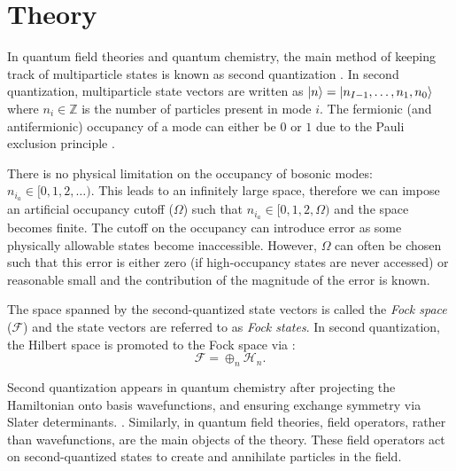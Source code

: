 \section{Theory}

In quantum field theories and quantum chemistry, the main method of keeping track of multiparticle states is known as second quantization \cite{Sakurai_Napolitano_2020}.
In second quantization, multiparticle state vectors are written as $\ket{n} = \ket{n_{I-1}, \dots, n_1, n_0}$ where $n_i \in \mathbb{Z}$ is the number of particles present in mode $i$.
The fermionic (and antifermionic) occupancy of a mode can either be $0$ or $1$ due to the Pauli exclusion principle .

There is no physical limitation on the occupancy of bosonic modes: $n_{i_a} \in [0, 1, 2, \dots)$.
This leads to an infinitely large space, therefore we can impose an artificial occupancy cutoff ($\Omega$) such that $n_{i_a} \in [0, 1, 2, \Omega)$ and the space becomes finite.
The cutoff on the occupancy can introduce error as some physically allowable states become inaccessible.
However, $\Omega$ can often be chosen such that this error is either zero (if high-occupancy states are never accessed) or reasonable small and the contribution of the magnitude of the error is known. 

The space spanned by the second-quantized state vectors is called the \textit{Fock space} ($\mathcal{F}$) and the state vectors are referred to as \textit{Fock states}.
In second quantization, the Hilbert space is promoted to the Fock space via \cite{Schwartz_2013}:
\begin{equation}
    \mathcal{F} = \oplus_n \mathcal{H}_n.
\end{equation}

Second quantization appears in quantum chemistry after projecting the Hamiltonian onto basis wavefunctions, and ensuring exchange symmetry via Slater determinants. .
Similarly, in quantum field theories, field operators, rather than wavefunctions, are the main objects of the theory. These field operators act on second-quantized states to create and annihilate particles in the field. 

